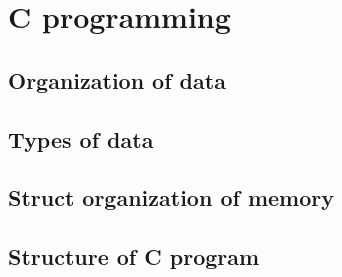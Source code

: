 \chapter{C programming}

\section{Organization of data}\label{littleBig}

\section{Types of data}

\section{Struct organization of memory}

\section{Structure of C program}